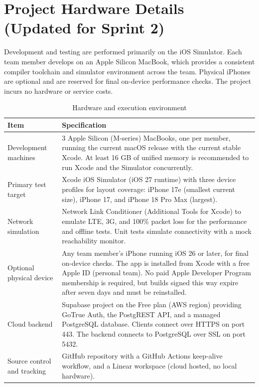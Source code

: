 \documentclass[12pt,letterpaper]{article}
\begin{document}
\section{Project Hardware Details (Updated for Sprint 2)}
Development and testing are performed primarily on the iOS Simulator. Each team member
develops on an Apple Silicon MacBook, which provides a consistent compiler toolchain
and simulator environment across the team. Physical iPhones are optional and are
reserved for final on-device performance checks. The project incurs no hardware or
service costs.

\begin{table}[H]
\centering
\caption{Hardware and execution environment}
\label{tab:hardware}
\begin{tabularx}{\textwidth}{@{}L{3.3cm} Y@{}}
\toprule
\textbf{Item} & \textbf{Specification} \\
\midrule
Development machines & 3 Apple Silicon (M-series) MacBooks, one per member, running the current macOS release with the current stable Xcode. At least 16 GB of unified memory is recommended to run Xcode and the Simulator concurrently. \\
Primary test target & Xcode iOS Simulator (iOS 27 runtime) with three device profiles for layout coverage: iPhone 17e (smallest current size), iPhone 17, and iPhone 18 Pro Max (largest). \\
Network simulation & Network Link Conditioner (Additional Tools for Xcode) to emulate LTE, 3G, and 100\% packet loss for the performance and offline tests. Unit tests simulate connectivity with a mock reachability monitor. \\
Optional physical device & Any team member's iPhone running iOS 26 or later, for final on-device checks. The app is installed from Xcode with a free Apple ID (personal team). No paid Apple Developer Program membership is required, but builds signed this way expire after seven days and must be reinstalled. \\
Cloud backend & Supabase project on the Free plan (AWS region) providing GoTrue Auth, the PostgREST API, and a managed PostgreSQL database. Clients connect over HTTPS on port 443. The backend connects to PostgreSQL over SSL on port 5432. \\
Source control and tracking & GitHub repository with a GitHub Actions keep-alive workflow, and a Linear workspace (cloud hosted, no local hardware). \\
\bottomrule
\end{tabularx}
\end{table}
\end{document}
